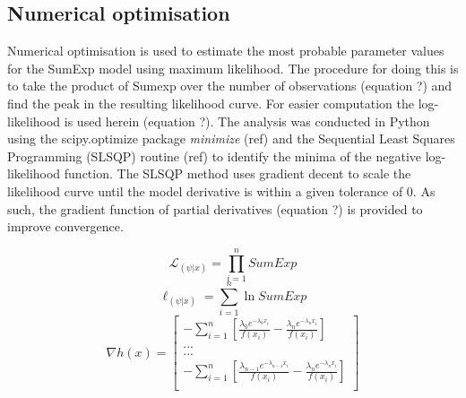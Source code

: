 \documentclass[11pt,usenames,dvipsnames,a4paper]{article}
\newcommand{\Lagr}{\mathcal{L}}
\begin{document}
\subsection{Numerical optimisation}

\begin{linenumbers}
\hspace{\parindent}
Numerical optimisation is used to estimate the most probable parameter values for the SumExp model using maximum likelihood. The procedure for doing this is to take the product of Sumexp over the number of observations (equation ?) and find the peak in the resulting likelihood curve. For easier computation the log-likelihood is used herein (equation ?). The analysis was conducted in Python using the scipy.optimize package \textit{minimize} (ref) and the Sequential Least Squares Programming (SLSQP) routine (ref) to identify the minima of the negative log-likelihood function. The SLSQP method uses gradient decent to scale the likelihood curve until the model derivative is within a given tolerance of 0. As such, the gradient function of partial derivatives (equation ?) is provided to improve convergence.
\end{linenumbers}
\begin{equation}
\Lagr_{(\psi|x)} = \prod_{i=1}^{n} SumExp
\end{equation} 
\begin{equation}
\ell_{(\psi|x)} = \sum_{i=1}^{n} \ln SumExp
\end{equation} 
\begin{equation}
\nabla h(x) = \begin{bmatrix} -\sum_{i=1}^{n} [\frac{\lambda_0 e^{-\lambda_0 x_i}}{f(x_i)} - \frac{\lambda_n e^{-\lambda_n x_i}}{f(x_i)}] \\
... \\
... \\
-\sum_{i=1}^{n} [\frac{\lambda_{n-1} e^{-\lambda_{n-1} x_i}}{f(x_i)} - \frac{\lambda_n e^{-\lambda_n x_i}}{f(x_i)}] \\
\end{bmatrix}
\end{equation}
\end{document}
